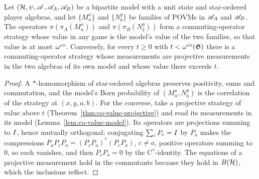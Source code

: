 \begin{lemma}
\label{lem:model-strategy-co}
\leanok
Let $(\mathcal{H}, \psi, \mathscr{A}, \mathscr{A}_A, \mathscr{A}_B)$ be a bipartite model with a unit state and star-ordered
player algebras, and let $\{M^x_a\}$ and $\{N^y_b\}$ be families of POVMs in $\mathscr{A}_A$ and
$\mathscr{A}_B$. The operators $\pi(\pi_A(M^x_a))$ and $\pi(\pi_B(N^y_b))$ form a commuting-operator
strategy whose value in any game is the model's value of the two families, so that value is at
most $\omega^{\mathrm{co}}$. Conversely, for every $t \geq 0$ with $t < \omega^{\mathrm{co}}(\mathfrak{G})$ there is a
commuting-operator strategy whose measurements are projective measurements in the two algebras
of its own model and whose value there exceeds $t$.
\end{lemma}

\begin{proof}
\leanok
A $*$-homomorphism of star-ordered algebras preserves positivity, sums and commutation, and the
model's Born probability of $(M^x_a, N^y_b)$ is the correlation of the strategy at
$(x, y, a, b)$. For the converse, take a projective strategy of value above $t$
(Theorem~\ref{thm:co-value-projective}) and read its measurements in its model
(Lemma~\ref{lem:co-value-model}). Its operators are projections summing to $I$, hence
mutually orthogonal: conjugating $\sum_c P_c = I$ by $P_a$ makes the compressions
$P_a P_c P_a = (P_c P_a)^*(P_c P_a)$, $c \neq a$, positive operators summing to $0$, so each
vanishes, and then $P_c P_a = 0$ by the C$^*$-identity. The equations of a projective
measurement hold in the commutants because they hold in $B(\mathcal{H})$, which the inclusions reflect.
\end{proof}

